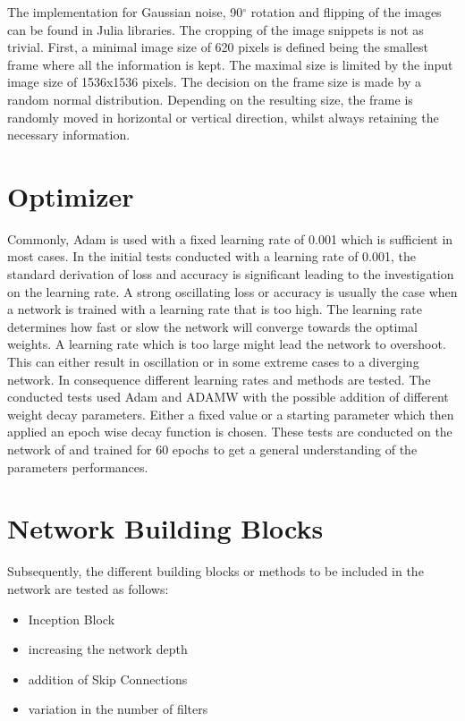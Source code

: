 \documentclass[
a4paper, 
12pt,
grayscalebody, %
abstract=on,
twoside, BCOR10mm, 12pt, DIV13,headinclude, footexclude, final, abstracton, openright
]{ibireprt}
\numberwithin{equation}{chapter}
\numberwithin{table}{chapter}
\numberwithin{figure}{chapter}
\numberwithin{algorithm}{chapter}
\numberwithin{example}{chapter}
\numberwithin{example}{chapter}
\begin{document}
The implementation for Gaussian noise, 90$^{\circ}$ rotation and flipping of the images can be found in Julia libraries. The cropping of the image snippets is not as trivial. First, a minimal image size of 620 pixels is defined being the smallest frame where all the information is kept. The maximal size is limited by the input image size of 1536x1536 pixels. The decision on the frame size is made by a random normal distribution. Depending on the resulting size, the frame is randomly moved in horizontal or vertical direction, whilst always retaining the necessary information.

\section{Optimizer}
Commonly, Adam is used with a fixed learning rate of 0.001 which is sufficient in most cases. In the initial tests conducted with a learning rate of 0.001, the standard derivation of loss and accuracy is significant leading to the investigation on the learning rate. A strong oscillating loss or accuracy is usually the case when a network is trained with a learning rate that is too high. The learning rate determines how fast or slow the network will converge towards the optimal weights. A learning rate which is too large might lead the network to overshoot. This can either result in oscillation or in some extreme cases to a diverging network. In consequence different learning rates and methods are tested. The conducted tests used Adam and ADAMW with the possible addition of different weight decay parameters. Either a fixed value or a starting parameter which then applied an epoch wise decay function is chosen. These tests are conducted on the network of \cite{Walle2023} and trained for 60 epochs to get a general understanding of the parameters performances.


\section{Network Building Blocks}
Subsequently, the different building blocks or methods to be included in the network are tested as follows:

\begin{itemize}
	\item Inception Block 
	\item increasing the network depth
	\item addition of Skip Connections
	\item variation in the number of filters
\end{itemize}
\end{document}

